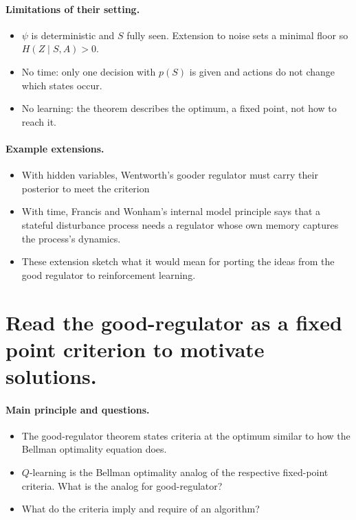 \documentclass[10pt]{article}
\begin{document}
\paragraph{Limitations of their setting.}
\begin{itemize}
  \item $\psi$ is deterministic and $S$ fully seen. Extension to noise sets a minimal floor so $H(Z \mid S,A) > 0$.
\item No time: only one decision with $p(S)$ is given and actions do not change which states occur.
  \item No learning: the theorem describes the optimum, a fixed point, not how to reach it.
\end{itemize}
\paragraph{Example extensions.}
\begin{itemize}
  \item With hidden variables, Wentworth's gooder regulator must carry their posterior to meet the criterion
  \item With time, Francis and Wonham's internal model principle says that a stateful disturbance process needs a regulator whose own memory captures the process's dynamics.
  \item These extension sketch what it would mean for porting the ideas from the good regulator to reinforcement learning.
\end{itemize}

\section{Read the good-regulator as a fixed point criterion to motivate solutions.}


\paragraph{Main principle and questions.}
\begin{itemize}
  \item {The good-regulator theorem states criteria at the optimum similar to how the Bellman optimality equation does.}
  \item {$Q$-learning is the Bellman optimality analog of the respective fixed-point criteria. What is the analog for good-regulator?}
  \item What do the criteria imply and require of an algorithm?
\end{itemize}
\end{document}
